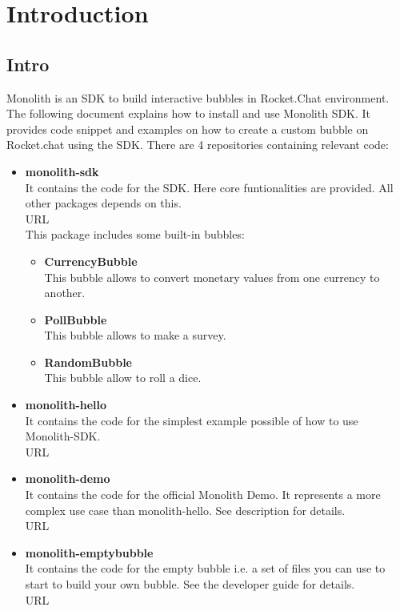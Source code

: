 \section{Introduction}
\subsection{Intro}
Monolith is an SDK to build interactive bubbles in Rocket.Chat environment.
The following document explains how to install and use Monolith SDK.
It provides code snippet and examples on how to create a custom bubble on Rocket.chat using the SDK.
There are 4 repositories containing relevant code:
\begin{itemize}
\item \textbf{monolith-sdk}\\
It contains the code for the SDK. Here core funtionalities are provided. All other packages depends on this.\\
URL\\
This package includes some built-in bubbles:
\begin{itemize}
\item \textbf{CurrencyBubble}\\
This bubble allows to convert monetary values from one currency to another.
\item \textbf{PollBubble}\\
This bubble allows to make a survey.
\item \textbf{RandomBubble}\\
This bubble allow to roll a dice.
\end{itemize}

\item \textbf{monolith-hello}\\
It contains the code for the simplest example possible of how to use Monolith-SDK.\\
URL
\item \textbf{monolith-demo}\\
It contains the code for the official Monolith Demo. It represents a more complex use case than monolith-hello. See description for details.\\
URL
\item \textbf{monolith-emptybubble}\\
It contains the code for the empty bubble i.e. a set of files you can use to start to build your own bubble. See the developer guide for details.\\
URL
\end{itemize}

